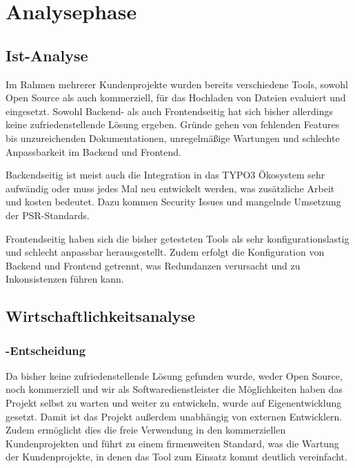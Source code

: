\section{Analysephase} 
\label{sec:Analysephase}


\subsection{Ist-Analyse} 
\label{sec:IstAnalyse}

Im Rahmen mehrerer Kundenprojekte wurden bereits verschiedene Tools, sowohl Open Source als auch kommerziell, für das Hochladen von Dateien evaluiert und eingesetzt. Sowohl Backend- als auch Frontendseitig hat sich bisher allerdings keine zufriedenstellende Lösung ergeben. Gründe gehen von fehlenden Features bis unzureichenden Dokumentationen, unregelmäßige Wartungen und schlechte Anpassbarkeit im Backend und Frontend. 

Backendseitig ist meist auch die Integration in das TYPO3 Ökosystem sehr aufwändig oder muss jedes Mal neu entwickelt werden, was zusätzliche Arbeit und kosten bedeutet. Dazu kommen Security Issues und mangelnde Umsetzung der PSR-Standards.  

Frontendseitig haben sich die bisher getesteten Tools als sehr konfigurationslastig und schlecht anpassbar herausgestellt. Zudem erfolgt die Konfiguration von Backend und Frontend getrennt, was Redundanzen verursacht und zu Inkonsistenzen führen kann. 


\subsection{Wirtschaftlichkeitsanalyse}
\label{sec:Wirtschaftlichkeitsanalyse}


\subsubsection{-Entscheidung}
\label{sec:MakeOrBuyEntscheidung}
Da bisher keine zufriedenstellende Lösung gefunden wurde, weder Open Source, noch kommerziell und wir als Softwaredienstleister die Möglichkeiten haben das Projekt selbst zu warten und weiter zu entwickeln, wurde auf Eigenentwicklung gesetzt. Damit ist das Projekt außerdem unabhängig von externen Entwicklern. Zudem ermöglicht dies die freie Verwendung in den kommerziellen Kundenprojekten und führt zu einem firmenweiten Standard, was die Wartung der Kundenprojekte, in denen das Tool zum Einsatz kommt deutlich vereinfacht.

